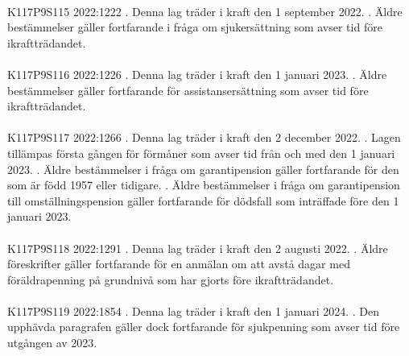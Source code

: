 \documentclass[a4paper,notitlepage,openany,10pt]{book}
\begin{document}
\paragraph*{}
{\tiny K117P9S115}
2022:1222
. Denna lag träder i kraft den 1 september 2022.
. Äldre bestämmelser gäller fortfarande i fråga om sjukersättning som avser tid före ikraftträdandet.
\paragraph*{}
{\tiny K117P9S116}
2022:1226
. Denna lag träder i kraft den 1 januari 2023.
. Äldre bestämmelser gäller fortfarande för assistansersättning som avser tid före ikraftträdandet.
\paragraph*{}
{\tiny K117P9S117}
2022:1266
. Denna lag träder i kraft den 2 december 2022.
. Lagen tillämpas första gången för förmåner som avser tid från och med den 1 januari 2023.
. Äldre bestämmelser i fråga om garantipension gäller fortfarande för den som är född 1957 eller tidigare.
. Äldre bestämmelser i fråga om garantipension till omställningspension gäller fortfarande för dödsfall som inträffade före den 1 januari 2023.
\paragraph*{}
{\tiny K117P9S118}
2022:1291
. Denna lag träder i kraft den 2 augusti 2022.
. Äldre föreskrifter gäller fortfarande för en anmälan om att avstå dagar med föräldrapenning på grundnivå som har gjorts före ikraftträdandet.
\paragraph*{}
{\tiny K117P9S119}
2022:1854
. Denna lag träder i kraft den 1 januari 2024.
. Den upphävda paragrafen gäller dock fortfarande för sjukpenning som avser tid före utgången av 2023.
\end{document}
